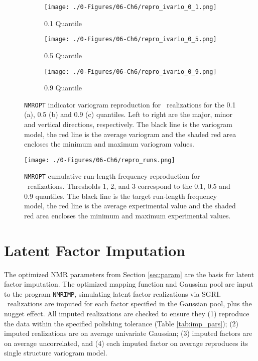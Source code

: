 \begin{figure}
    \begin{subfigure}{1.0\textwidth}
        \centering
        \texttt{[image: ./0-Figures/06-Ch6/repro\_ivario\_0\_1.png]}
        \caption{0.1 Quantile}
    \end{subfigure}
    \begin{subfigure}{1.0\textwidth}
        \centering
        \texttt{[image: ./0-Figures/06-Ch6/repro\_ivario\_0\_5.png]}
        \caption{0.5 Quantile}
    \end{subfigure}
    \begin{subfigure}{1.0\textwidth}
        \centering
        \texttt{[image: ./0-Figures/06-Ch6/repro\_ivario\_0\_9.png]}
        \caption{0.9 Quantile}
    \end{subfigure}
    \caption{\texttt{NMROPT} indicator variogram reproduction for \csnreals \ realizations for the 0.1 (a), 0.5 (b) and 0.9 (c) quantiles. Left to right are the major, minor and vertical directions, respectively. The black line is the variogram model, the red line is the average variogram and the shaded red area encloses the minimum and maximum variogram values.}
    \label{fig:nmropt_repro_ivario}
\end{figure}

\begin{figure}[htb!]
    \centering
    \texttt{[image: ./0-Figures/06-Ch6/repro\_runs.png]}
    \caption{\texttt{NMROPT} cumulative run-length frequency reproduction for \csnreals \ realizations. Thresholds 1, 2, and 3 correspond to the 0.1, 0.5 and 0.9 quantiles. The black line is the target run-length frequency model, the red line is the average experimental value and the shaded red area encloses the minimum and maximum experimental values.}
    \label{fig:nmropt_repro_runs}
\end{figure}


\FloatBarrier
\section{Latent Factor Imputation}
\label{sec:fact_imp}

The optimized \gls{NMR} parameters from Section \ref{sec:param} are the basis for latent factor imputation. The optimized mapping function and Gaussian pool are input to the program \texttt{NMRIMP}, simulating latent factor realizations via \gls{SGRI}. \csnreals \ realizations are imputed for each factor specified in the Gaussian pool, plus the nugget effect. All imputed realizations are checked to ensure they (1) reproduce the data within the specified polishing tolerance (Table \ref{tab:imp_pars}); (2) imputed realizations are on average univariate Gaussian; (3) imputed factors are on average uncorrelated, and (4) each imputed factor on average reproduces its single structure variogram model.

